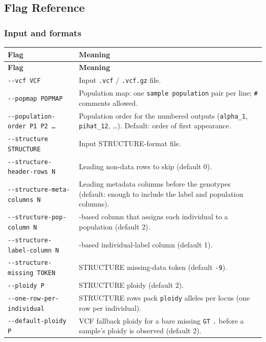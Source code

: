 \documentclass[11pt]{article}
\begin{document}
\subsection{Flag Reference}
\label{sec:flags}

\subsubsection*{Input and formats}
\begin{longtable}{@{}>{\raggedright\arraybackslash}p{}>{\raggedright\arraybackslash}p{}@{}}
\toprule
\textbf{Flag} & \textbf{Meaning} \\
\midrule
\endfirsthead
\toprule
\textbf{Flag} & \textbf{Meaning} \\
\midrule
\endhead
\texttt{-{}-vcf VCF} & Input \texttt{.vcf} / \texttt{.vcf.gz} file. \\
\texttt{-{}-popmap POPMAP} & Population map: one \texttt{sample population} pair per line; \texttt{\#} comments allowed. \\
\texttt{-{}-population-order P1 P2 \ldots} & Population order for the numbered outputs (\texttt{alpha\_1}, \texttt{pihat\_12}, \ldots). Default: order of first appearance. \\
\texttt{-{}-structure STRUCTURE} & Input STRUCTURE-format file. \\
\texttt{-{}-structure-header-rows N} & Leading non-data rows to skip (default 0). \\
\texttt{-{}-structure-meta-columns N} & Leading metadata columns before the genotypes (default: enough to include the label and population columns). \\
\texttt{-{}-structure-pop-column N} & 1-based column that assigns each individual to a population (default 2). \\
\texttt{-{}-structure-label-column N} & 1-based individual-label column (default 1). \\
\texttt{-{}-structure-missing TOKEN} & STRUCTURE missing-data token (default \texttt{-9}). \\
\texttt{-{}-ploidy P} & STRUCTURE ploidy (default 2). \\
\texttt{-{}-one-row-per-individual} & STRUCTURE rows pack \texttt{ploidy} alleles per locus (one row per individual). \\
\texttt{-{}-default-ploidy P} & VCF fallback ploidy for a bare missing \texttt{GT} \texttt{.} before a sample's ploidy is observed (default 2). \\
\bottomrule
\end{longtable}
\end{document}
